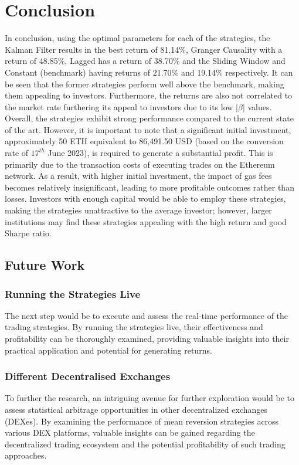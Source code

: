 \chapter{Conclusion}

In conclusion, using the optimal parameters for each of the strategies, the Kalman Filter results in the best return of 81.14\%, Granger Causality with a return of 48.85\%, Lagged has a return of 38.70\% and the Sliding Window and Constant (benchmark) having returns of  21.70\% and 19.14\% respectively. It can be seen that the former strategies perform well above the benchmark, making them appealing to investors. Furthermore, the returns are also not correlated to the market rate furthering its appeal to investors due to its low $|\beta|$ values.
\\[3mm]
Overall, the strategies exhibit strong performance compared to the current state of the art. However, it is important to note that a significant initial investment, approximately 50 ETH equivalent to 86,491.50 USD (based on the conversion rate of $17^{th}$ June 2023), is required to generate a substantial profit. This is primarily due to the transaction costs of executing trades on the Ethereum network. As a result, with higher initial investment, the impact of gas fees becomes relatively insignificant, leading to more profitable outcomes rather than losses. Investors with enough capital would be able to employ these strategies, making the strategies unattractive to the average investor; however, larger institutions may find these strategies appealing with the high return and good Sharpe ratio.

\section{Future Work}

\subsection{Running the Strategies Live}
The next step would be to execute and assess the real-time performance of the trading strategies. By running the strategies live, their effectiveness and profitability can be thoroughly examined, providing valuable insights into their practical application and potential for generating returns.

\subsection{Different Decentralised Exchanges}
To further the research, an intriguing avenue for further exploration would be to assess statistical arbitrage opportunities in other decentralized exchanges (DEXes). By examining the performance of mean reversion strategies across various DEX platforms, valuable insights can be gained regarding the decentralized trading ecosystem and the potential profitability of such trading approaches.

